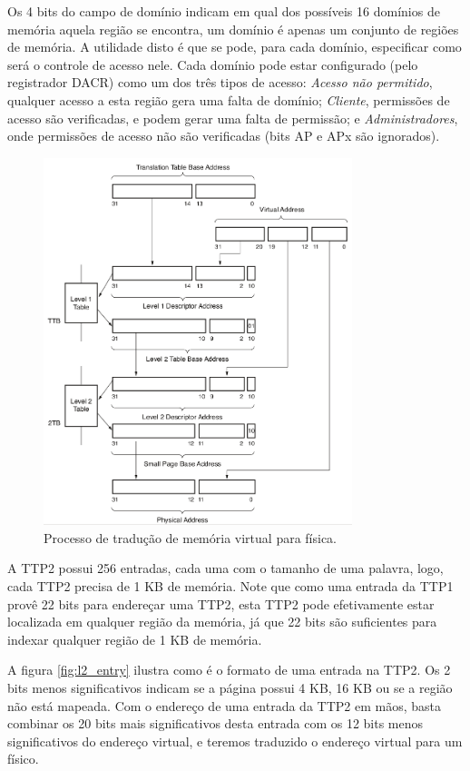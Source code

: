 Os 4 bits do campo de domínio indicam em qual dos possíveis 16 domínios de memória aquela região se encontra, um domínio é apenas um conjunto de regiões de memória. A utilidade disto é que se pode, para cada domínio, especificar como será o controle de acesso nele. Cada domínio pode estar configurado (pelo registrador DACR) como um dos três tipos de acesso: \emph{Acesso não permitido}, qualquer acesso a esta região gera uma falta de domínio; \emph{Cliente}, permissões de acesso são verificadas, e podem gerar uma falta de permissão; e \emph{Administradores}, onde permissões de acesso não são verificadas (bits AP e APx são ignorados).

\begin{figure}[h]
    \centering
    \includegraphics[width=9cm]{figuras/translation}
    \caption{Processo de tradução de memória virtual para física.}
    \label{fig:translation}
\end{figure}

A TTP2 possui 256 entradas, cada uma com o tamanho de uma palavra, logo, cada TTP2 precisa de 1 KB de memória. Note que como uma entrada da TTP1 provê 22 bits para endereçar uma TTP2, esta TTP2 pode efetivamente estar localizada em qualquer região da memória, já que 22 bits são suficientes para indexar qualquer região de 1 KB de memória.

A figura \ref{fig:l2_entry} ilustra como é o formato de uma entrada na TTP2. Os 2 bits menos significativos indicam se a página possui 4 KB, 16 KB ou se a região não está mapeada. Com o endereço de uma entrada da TTP2 em mãos, basta combinar os 20 bits mais significativos desta entrada com os 12 bits menos significativos do endereço virtual, e teremos traduzido o endereço virtual para um físico.

